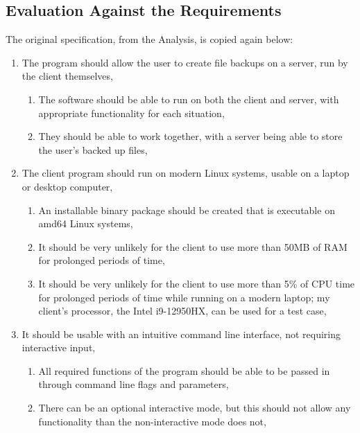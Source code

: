 \documentclass[../main.tex]{subfiles}
\begin{document}
\newenvironment{qanda}{\setlength{\parindent}{0pt}}{\smallskip}
\newcommand{\Q}{\bigskip\bfseries Q: }
\newcommand{\A}{\par\textbf{A:} \normalfont}

\subsection{Evaluation Against the Requirements}

The original specification, from the Analysis, is copied again below:

\begin{enumerate}
    \item The program should allow the user to create file backups on a server, run by the client themselves, 
    \begin{enumerate}
        \item The software should be able to run on both the client and server, with appropriate functionality for each situation,
        \item They should be able to work together, with a server being able to store the user’s backed up files, 
    \end{enumerate}
    \item The client program should run on modern Linux systems, usable on a laptop or desktop computer, 
    \begin{enumerate}
        \item An installable binary package should be created that is executable on amd64 Linux systems, 
        \item It should be very unlikely for the client to use more than 50MB of RAM for prolonged periods of time,
        \item It should be very unlikely for the client to use more than 5\% of CPU time for prolonged periods of time while running on a modern laptop; my client's processor, the Intel i9-12950HX, can be used for a test case,
    \end{enumerate}
    \item It should be usable with an intuitive command line interface, not requiring interactive input, 
    \begin{enumerate}
        \item All required functions of the program should be able to be passed in through command line flags and parameters, 
        \item There can be an optional interactive mode, but this should not allow any functionality than the non-interactive mode does not, 

\end{enumerate}
\end{enumerate}
\end{document}

